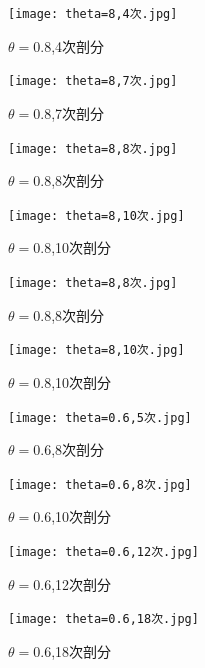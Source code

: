 \documentclass[12pt]{ctexart}
\begin{document}
\begin{figure}[H]
	\centering
	\begin{minipage}[t]{0.48\textwidth}
		\centering
		\texttt{[image: theta=8,4次.jpg]}
		\caption{$\theta=0.8$,4次剖分}
	\end{minipage}
	\begin{minipage}[t]{0.48\textwidth}
		\centering
		\texttt{[image: theta=8,7次.jpg]}
		\caption{$\theta=0.8$,7次剖分}
	\end{minipage}
\end{figure}
\begin{figure}[H]
	\centering
	\begin{minipage}[t]{0.48\textwidth}
		\centering
		\texttt{[image: theta=8,8次.jpg]}
		\caption{$\theta=0.8$,8次剖分}
	\end{minipage}
	\begin{minipage}[t]{0.48\textwidth}
		\centering
		\texttt{[image: theta=8,10次.jpg]}
		\caption{$\theta=0.8$,10次剖分}
		\end{minipage}
	\end{figure}
\begin{figure}[H]
	\centering
	\begin{minipage}[t]{0.48\textwidth}
		\centering
		\texttt{[image: theta=8,8次.jpg]}
		\caption{$\theta=0.8$,8次剖分}
	\end{minipage}
	\begin{minipage}[t]{0.48\textwidth}
		\centering
		\texttt{[image: theta=8,10次.jpg]}
		\caption{$\theta=0.8$,10次剖分}
	\end{minipage}
\end{figure}
\begin{figure}[H]
	\centering
	\begin{minipage}[t]{0.48\textwidth}
		\centering
		\texttt{[image: theta=0.6,5次.jpg]}
		\caption{$\theta=0.6$,8次剖分}
	\end{minipage}
	\begin{minipage}[t]{0.48\textwidth}
		\centering
		\texttt{[image: theta=0.6,8次.jpg]}
		\caption{$\theta=0.6$,10次剖分}
	\end{minipage}
\end{figure}
\begin{figure}[H]
	\centering
	\begin{minipage}[t]{0.48\textwidth}
		\centering
		\texttt{[image: theta=0.6,12次.jpg]}
		\caption{$\theta=0.6$,12次剖分}
	\end{minipage}
	\begin{minipage}[t]{0.48\textwidth}
		\centering
		\texttt{[image: theta=0.6,18次.jpg]}
		\caption{$\theta=0.6$,18次剖分}
	\end{minipage}
\end{figure}
\end{document}
